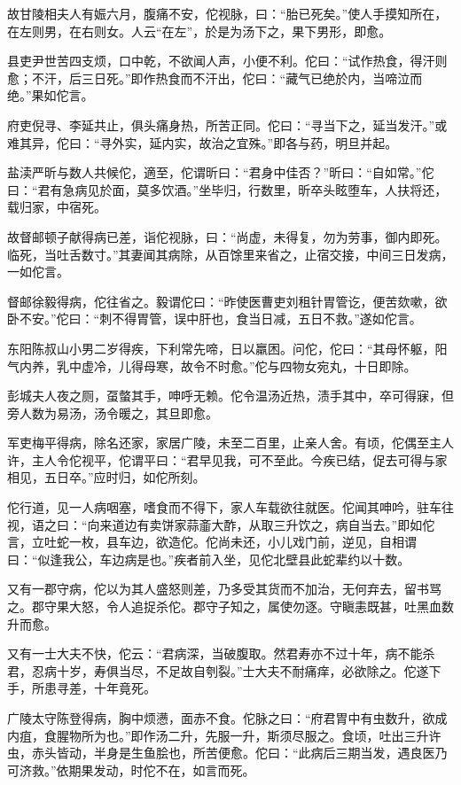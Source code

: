 \documentclass[12pt,UTF8]{ctexbook}
\begin{document}
故甘陵相夫人有娠六月，腹痛不安，佗视脉，曰：“胎已死矣。”使人手摸知所在，在左则男，在右则女。人云“在左”，於是为汤下之，果下男形，即愈。

县吏尹世苦四支烦，口中乾，不欲闻人声，小便不利。佗曰：“试作热食，得汗则愈；不汗，后三日死。”即作热食而不汗出，佗曰：“藏气已绝於内，当啼泣而绝。”果如佗言。

府吏倪寻、李延共止，俱头痛身热，所苦正同。佗曰：“寻当下之，延当发汗。”或难其异，佗曰：“寻外实，延内实，故治之宜殊。”即各与药，明旦并起。

盐渎严昕与数人共候佗，適至，佗谓昕曰：“君身中佳否？”昕曰：“自如常。”佗曰：“君有急病见於面，莫多饮酒。”坐毕归，行数里，昕卒头眩堕车，人扶将还，载归家，中宿死。

故督邮顿子献得病已差，诣佗视脉，曰：“尚虚，未得复，勿为劳事，御内即死。临死，当吐舌数寸。”其妻闻其病除，从百馀里来省之，止宿交接，中间三日发病，一如佗言。

督邮徐毅得病，佗往省之。毅谓佗曰：“昨使医曹吏刘租针胃管讫，便苦欬嗽，欲卧不安。”佗曰：“刺不得胃管，误中肝也，食当日减，五日不救。”遂如佗言。

东阳陈叔山小男二岁得疾，下利常先啼，日以羸困。问佗，佗曰：“其母怀躯，阳气内养，乳中虚冷，儿得母寒，故令不时愈。”佗与四物女宛丸，十日即除。

彭城夫人夜之厕，虿螫其手，呻呼无赖。佗令温汤近热，渍手其中，卒可得寐，但旁人数为易汤，汤令暖之，其旦即愈。

军吏梅平得病，除名还家，家居广陵，未至二百里，止亲人舍。有顷，佗偶至主人许，主人令佗视平，佗谓平曰：“君早见我，可不至此。今疾已结，促去可得与家相见，五日卒。”应时归，如佗所刻。

佗行道，见一人病咽塞，嗜食而不得下，家人车载欲往就医。佗闻其呻吟，驻车往视，语之曰：“向来道边有卖饼家蒜齑大酢，从取三升饮之，病自当去。”即如佗言，立吐蛇一枚，县车边，欲造佗。佗尚未还，小儿戏门前，逆见，自相谓曰：“似逢我公，车边病是也。”疾者前入坐，见佗北壁县此蛇辈约以十数。

又有一郡守病，佗以为其人盛怒则差，乃多受其货而不加治，无何弃去，留书骂之。郡守果大怒，令人追捉杀佗。郡守子知之，属使勿逐。守瞋恚既甚，吐黑血数升而愈。

又有一士大夫不快，佗云：“君病深，当破腹取。然君寿亦不过十年，病不能杀君，忍病十岁，寿俱当尽，不足故自刳裂。”士大夫不耐痛痒，必欲除之。佗遂下手，所患寻差，十年竟死。

广陵太守陈登得病，胸中烦懑，面赤不食。佗脉之曰：“府君胃中有虫数升，欲成内疽，食腥物所为也。”即作汤二升，先服一升，斯须尽服之。食顷，吐出三升许虫，赤头皆动，半身是生鱼脍也，所苦便愈。佗曰：“此病后三期当发，遇良医乃可济救。”依期果发动，时佗不在，如言而死。
\end{document}
